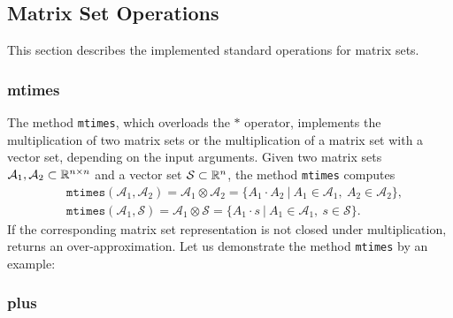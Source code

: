 \subsection{Matrix Set Operations} \label{sec:matSetOperations}

This section describes the implemented standard operations for matrix sets.

\subsubsection{mtimes}
\label{sec:mtimesMatSet}

The method \texttt{mtimes}, which overloads the $*$ operator, implements the multiplication of two matrix sets or the multiplication of a matrix set with a vector set, depending on the input arguments. Given two matrix sets $\mathcal{A}_1,\mathcal{A}_2 \subset \mathbb{R}^{n \times n}$ and a vector set $\mathcal{S} \subset \mathbb{R}^n$, the method \texttt{mtimes} computes
\begin{equation*}
	\begin{split}
		& \texttt{mtimes}(\mathcal{A}_1,\mathcal{A}_2) = \mathcal{A}_1 \otimes \mathcal{A}_2 = \{ A_1 \cdot A_2~|~ A_1 \in \mathcal{A}_1,~A_2 \in \mathcal{A}_2 \}, \\
		& \texttt{mtimes}(\mathcal{A}_1,\mathcal{S}) = \mathcal{A}_1 \otimes \mathcal{S} = \{ A_1 \cdot s ~|~ A_1 \in \mathcal{A}_1,~s \in \mathcal{S} \}.
	\end{split}
\end{equation*}  
If the corresponding matrix set representation is not closed under multiplication,  returns an over-approximation. Let us demonstrate the method \texttt{mtimes} by an example:

\begin{center}
\begin{minipage}[t]{0.35\textwidth}
	\footnotesize
	
\end{minipage}
\begin{minipage}[t]{0.6\textwidth}
	\vspace{0pt}
	\centering
\end{minipage}
\end{center}

\vspace{1cm}
\subsubsection{plus} \label{sec:plusMatSet}

